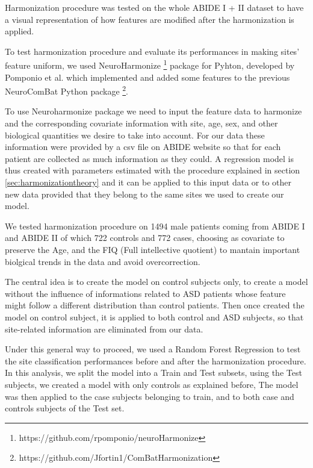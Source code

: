 \documentclass[11pt]{report}
\begin{document}
Harmonization procedure was tested on the whole ABIDE I + II dataset to have a visual representation of how features are modified after the harmonization is applied.

To test harmonization procedure and evaluate its performances in making sites' feature uniform, we used NeuroHarmonize \footnote{https://github.com/rpomponio/neuroHarmonize} package for Pyhton, developed by Pomponio et al. \cite{pomponio-2019} which implemented and added some features to the previous NeuroComBat Python package \footnote{https://github.com/Jfortin1/ComBatHarmonization}.

To use Neuroharmonize package we need to input the feature data to harmonize and the corresponding covariate information with site, age, sex, and other biological quantities we desire to take into account.
For our data these information were provided by a csv file on ABIDE website so that for each patient are collected as much information as they could.
A regression model is thus created with parameters estimated with the procedure explained in section \ref{sec:harmonizationtheory} and it can be applied to this input data or to other new data provided that they belong to the same sites we used to create our model.

We tested harmonization procedure on 1494 male patients coming from ABIDE I and ABIDE II of which 722 controls and 772 cases, choosing as covariate to preserve the Age, and the FIQ (Full intellective quotient) to mantain important biolgical trends in the data and avoid overcorrection.


The central idea is to create the model on control subjects only, to create a model without the influence of informations related to ASD patients whose feature might follow a different distribution than control patients.
Then once created the model on control subject, it is applied to both control and ASD subjects, so that site-related information are eliminated from our data.

Under this general way to proceed, we used a Random Forest Regression to test the site classification performances before and after the harmonization procedure.
In this analysis, we split the model into a Train and Test subsets, using the Test subjects, we created a model with only controls as explained before,
The model was then applied to the case subjects belonging to train, and to both case and controls subjects of the Test set.
\end{document}
